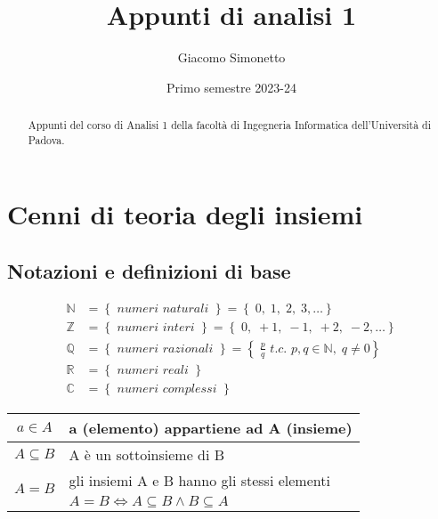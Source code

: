 \documentclass[a4paper]{article}
\title{Appunti di analisi 1}
\author{Giacomo Simonetto}
\date{Primo semestre 2023-24}
\begin{document}
\maketitle
\begin{abstract}
	Appunti del corso di Analisi 1 della facoltà di Ingegneria Informatica dell'Università di Padova.
\end{abstract}

\newpage

\tableofcontents

\newpage

\section{Cenni di teoria degli insiemi}
\subsection{Notazioni e definizioni di base}
\begin{align*}
	\mathbb{N} &= \left\{ \textit{ numeri naturali } \right\} = \left\{ \; 0, \; 1, \; 2, \; 3, \dots \right\} \\
	\mathbb{Z} &= \left\{ \textit{ numeri interi } \right\} = \left\{ \; 0, \; +1, \; -1, \; +2, \; -2, \dots \right\} \\
	\mathbb{Q} &= \left\{ \textit{ numeri razionali } \right\} = \left\{ \; \frac{p}{q} \textit{ t.c. } p,q \in \mathbb{N}, \; q \neq 0 \right\} \\
	\mathbb{R} &= \left\{ \textit{ numeri reali } \right\} \\
	\mathbb{C} &= \left\{ \textit{ numeri complessi } \right\}
\end{align*}

\begin{center}
	\begin{tabular}{c l}
		\(a \in A\) & a (elemento) appartiene ad A (insieme) \\
		\midrule
		\(A \subseteq B\) & A è un sottoinsieme di B \\
		\midrule
		\multirow{2}{*}{\(A = B\)} & gli insiemi A e B hanno gli stessi elementi \\
		& \(A = B \Leftrightarrow A \subseteq B \land B \subseteq A\)
	\end{tabular}
\end{center}
\end{document}
